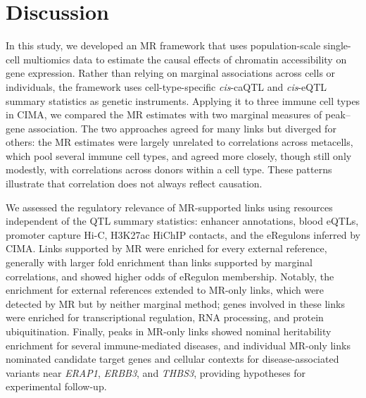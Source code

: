 \section{Discussion}
\label{sec:discussion}

\noindent In this study, we developed an MR framework that uses population-scale single-cell multiomics data to estimate the causal effects of chromatin accessibility on gene expression. Rather than relying on marginal associations across cells or individuals, the framework uses cell-type-specific \textit{cis}-caQTL and \textit{cis}-eQTL summary statistics as genetic instruments. Applying it to three immune cell types in CIMA, we compared the MR estimates with two marginal measures of peak--gene association. The two approaches agreed for many links but diverged for others: the MR estimates were largely unrelated to correlations across metacells, which pool several immune cell types, and agreed more closely, though still only modestly, with correlations across donors within a cell type. These patterns illustrate that correlation does not always reflect causation.

\noindent We assessed the regulatory relevance of MR-supported links using resources independent of the QTL summary statistics: enhancer annotations, blood eQTLs, promoter capture Hi-C, H3K27ac HiChIP contacts, and the eRegulons inferred by CIMA. Links supported by MR were enriched for every external reference, generally with larger fold enrichment than links supported by marginal correlations, and showed higher odds of eRegulon membership. Notably, the enrichment for external references extended to MR-only links, which were detected by MR but by neither marginal method; genes involved in these links were enriched for transcriptional regulation, RNA processing, and protein ubiquitination. Finally, peaks in MR-only links showed nominal heritability enrichment for several immune-mediated diseases, and individual MR-only links nominated candidate target genes and cellular contexts for disease-associated variants near \textit{ERAP1}, \textit{ERBB3}, and \textit{THBS3}, providing hypotheses for experimental follow-up.

